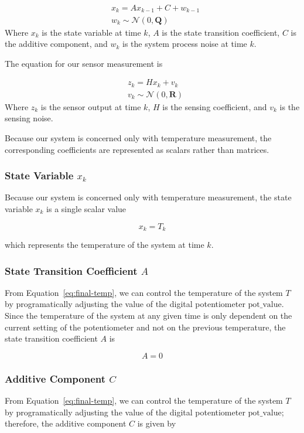 \documentclass[12pt,a4paper]{article}
\begin{document}
\begin{align}
    &x_k = A x_{k-1} + C + w_{k-1} \\
    &w_k \sim \mathcal{N}(0,\mathbf{Q}) \label{eq:q}
\end{align}
Where $x_k$ is the state variable at time $k$, $A$ is the state transition coefficient, $C$ is the additive component, and $w_k$ is the system process noise at time $k$.

The equation for our sensor measurement is

\begin{align}
    &z_k = H x_k + v_k \\
    &v_k \sim \mathcal{N}(0, \mathbf{R}) \label{eq:r}
\end{align}
Where $z_k$ is the sensor output at time $k$, $H$ is the sensing coefficient, and $v_k$ is the sensing noise.

Because our system is concerned only with temperature measurement, the corresponding coefficients are represented as scalars rather than matrices.

\subsubsection{State Variable $x_k$}
Because our system is concerned only with temperature measurement, the state variable $x_k$ is a single scalar value 

\begin{equation*}
    x_k = T_k
\end{equation*}

which represents the temperature of the system at time $k$.

\subsubsection{State Transition Coefficient $A$}
From Equation~\eqref{eq:final-temp}, we can control the temperature of the system $T$ by programatically adjusting the value of the digital potentiometer $\text{pot\_value}$. Since the temperature of the system at any given time is only dependent on the current setting of the potentiometer and not on the previous temperature, the state transition coefficient $A$ is

\begin{equation*}
    A = 0
\end{equation*}

\subsubsection{Additive Component $C$}
From Equation~\eqref{eq:final-temp}, we can control the temperature of the system $T$ by programatically adjusting the value of the digital potentiometer $\text{pot\_value}$; therefore, the additive component $C$ is given by
\end{document}
